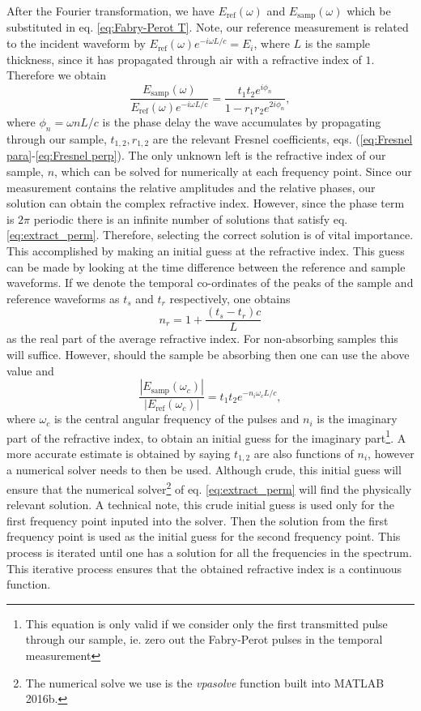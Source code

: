 After the Fourier transformation, we have $E_{\mbox{ref}}(\omega)$ and $E_{\mbox{samp}}(\omega)$ which be substituted in eq. \eqref{eq:Fabry-Perot T}. Note, our reference measurement is related to the incident waveform by $E_{\mbox{ref}}(\omega) e^{-i\omega L/c}=E_i$, where $L$ is the sample thickness, since it has propagated through air with a refractive index of $1$. Therefore we obtain
\begin{equation}
\frac{E_{\mbox{samp}} (\omega) }{ E_{\mbox{ref}} (\omega) e^{-i\omega L/c}} = \frac{ t_1 t_2e^{i\phi_n} }{ 1 - r_1 r_2 e^{2i\phi_n} },
\label{eq:extract_perm}
\end{equation}
where $\phi_n = \omega n L /c$ is the phase delay the wave accumulates by propagating through our sample, $t_{1,2}, r_{1,2}$ are the relevant Fresnel coefficients, eqs. (\ref{eq:Fresnel para}-\ref{eq:Fresnel perp}). The only unknown left is the refractive index of our sample, $n$, which can be solved for numerically at each frequency point. Since our measurement contains the relative amplitudes and the relative phases, our solution can obtain the complex refractive index. However, since the phase term is $2 \pi$ periodic there is an infinite number of solutions that satisfy eq. \eqref{eq:extract_perm}. Therefore, selecting the correct solution is of vital importance. This accomplished by making an initial guess at the refractive index. This guess can be made by looking at the time difference between the reference and sample waveforms. If we denote the temporal co-ordinates of the peaks of the sample and reference waveforms as $t_s$ and $t_r$ respectively, one obtains
\begin{equation}
n_r = 1 + \frac{(t_s-t_r)c}{L}
\label{eq:int_real}
\end{equation}
as the real part of the average refractive index. For non-absorbing samples this will suffice. However, should the sample be absorbing then one can use the above value and 
\begin{equation}
\frac{|E_{\mbox{samp}}(\omega_c)|}{|E_{\mbox{ref}}(\omega_c)|} = t_1 t_2 e^{-n_{i} \omega_c L/c},
\label{eq:int_imag}
\end{equation}
where $\omega_c$ is the central angular frequency of the pulses and $n_{i}$ is the imaginary part of the refractive index, to obtain an initial guess for the imaginary part\footnote{This equation is only valid if we consider only the first transmitted pulse through our sample, ie. zero out the Fabry-Perot pulses in the temporal measurement}. A more accurate estimate is obtained by saying $t_{1,2}$ are also functions of $n_{i}$, however a numerical solver needs to then be used. Although crude, this initial guess will ensure that the numerical solver\footnote{The numerical solve we use is the \textit{vpasolve} function built into MATLAB 2016b.} of eq. \eqref{eq:extract_perm} will find the physically relevant solution. A technical note, this crude initial guess is used only for the first frequency point inputed into the solver. Then the solution from the first frequency point is used as the initial guess for the second frequency point.  This process is iterated until one has a solution for all the frequencies in the spectrum. This iterative process ensures that the obtained refractive index is a continuous function. 

